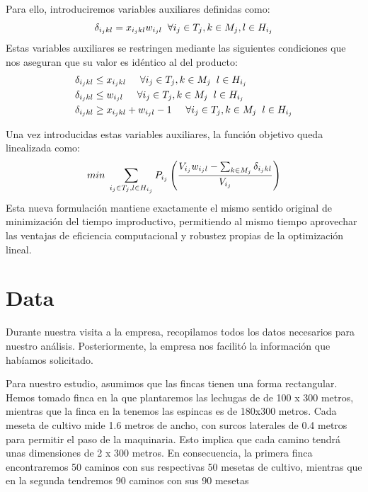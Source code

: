     Para ello, introduciremos variables auxiliares definidas como:
    \[
        \delta_{i_j k l}=x_{i_j k l}w_{i_j l} \hspace{0.2cm} \forall i_j \in T_j, k \in M_j, l \in H_{i_j}
    \]
    Estas variables auxiliares se restringen mediante las siguientes condiciones que nos aseguran que su valor es idéntico al del producto:
    \[\begin{aligned}
        \delta_{i_j k l} &\leq x_{i_j k l} \hspace{0.5cm} \forall i_j \in T_j, k \in M_j \hspace{0.2cm} l\in H_{i_j}\\
        \delta_{i_j k l} &\leq w_{i_j l} \hspace{0.5cm} \forall i_j \in T_j, k \in M_j \hspace{0.2cm} l\in H_{i_j}\\
	    \delta_{i_j k l} &\geq x_{i_j k l} + w_{i_j l} -1 \hspace{0.5cm} \forall i_j \in T_j, k \in M_j \hspace{0.2cm} l\in H_{i_j}
    \end{aligned}\]

    Una vez introducidas estas variables auxiliares, la función objetivo queda linealizada como:
	\[
        min\hspace{0.1cm} \sum_{i_j \in T_j, l\in H_{i_j}}P_{i_j}\left(\frac{V_{i_j}w_{i_j l}-\sum_{k\in M_j}\delta_{i_j k l}}{V_{i_j}}\right)
    \]
	Esta nueva formulación mantiene exactamente el mismo sentido original de minimización del tiempo improductivo,
    permitiendo al mismo tiempo aprovechar las ventajas de eficiencia computacional y robustez propias de la optimización lineal.



\chapter*{Data}

Durante nuestra visita a la empresa, recopilamos todos los datos necesarios para nuestro análisis. 
Posteriormente, la empresa nos facilitó la información que habíamos solicitado.

Para nuestro estudio, asumimos que las fincas tienen una forma rectangular. Hemos tomado finca en la que plantaremos las lechugas de
de 100 x 300 metros, mientras que la finca en la tenemos las espincas es de 180x300 metros. Cada meseta de cultivo mide 1.6 metros de ancho, 
con surcos laterales de 0.4 metros para permitir el paso de la maquinaria. Esto implica que cada camino tendrá unas dimensiones de 2 x 300 metros.
En consecuencia, la primera finca encontraremos 50 caminos con sus respectivas 50 mesetas de cultivo, mientras que en la segunda tendremos 
90 caminos con sus 90 mesetas

